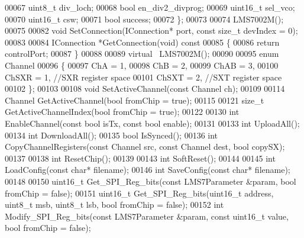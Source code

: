 \begin{DoxyCode}
00067         uint8\_t div_loch;
00068         \textcolor{keywordtype}{bool} en_div2_divprog;
00069         uint16\_t sel_vco;
00070         uint16\_t csw;
00071         \textcolor{keywordtype}{bool} success;
00072     \};
00073 
00074     LMS7002M();
00075 
00082     \textcolor{keywordtype}{void} SetConnection(IConnection* port, \textcolor{keyword}{const} \textcolor{keywordtype}{size\_t} devIndex = 0);
00083 
00084     IConnection *GetConnection(\textcolor{keywordtype}{void})\textcolor{keyword}{ const}
00085 \textcolor{keyword}{    }\{
00086         \textcolor{keywordflow}{return} controlPort;
00087     \}
00088 
00089     \textcolor{keyword}{virtual} ~LMS7002M();
00090 
00095     \textcolor{keyword}{enum} Channel
00096     \{
00097         ChA = 1,
00098         ChB = 2,
00099         ChAB = 3,
00100         ChSXR = 1, \textcolor{comment}{//SXR register space}
00101         ChSXT = 2, \textcolor{comment}{//SXT register space}
00102     \};
00103 
00108     \textcolor{keywordtype}{void} SetActiveChannel(\textcolor{keyword}{const} Channel ch);
00109 
00114     Channel GetActiveChannel(\textcolor{keywordtype}{bool} fromChip = \textcolor{keyword}{true});
00115 
00121     \textcolor{keywordtype}{size\_t} GetActiveChannelIndex(\textcolor{keywordtype}{bool} fromChip = \textcolor{keyword}{true});
00122 
00130     \textcolor{keywordtype}{int} EnableChannel(\textcolor{keyword}{const} \textcolor{keywordtype}{bool} isTx, \textcolor{keyword}{const} \textcolor{keywordtype}{bool} enable);
00131 
00133     \textcolor{keywordtype}{int} UploadAll();
00134     \textcolor{keywordtype}{int} DownloadAll();
00135     \textcolor{keywordtype}{bool} IsSynced();
00136     \textcolor{keywordtype}{int} CopyChannelRegisters(\textcolor{keyword}{const} Channel src, \textcolor{keyword}{const} Channel dest, \textcolor{keywordtype}{bool} copySX);
00137 
00138     \textcolor{keywordtype}{int} ResetChip();
00139 
00143     \textcolor{keywordtype}{int} SoftReset();
00144 
00145     \textcolor{keywordtype}{int} LoadConfig(\textcolor{keyword}{const} \textcolor{keywordtype}{char}* filename);
00146     \textcolor{keywordtype}{int} SaveConfig(\textcolor{keyword}{const} \textcolor{keywordtype}{char}* filename);
00148 
00150     uint16\_t Get_SPI_Reg_bits(\textcolor{keyword}{const} LMS7Parameter &param, \textcolor{keywordtype}{bool} fromChip = \textcolor{keyword}{false});
00151     uint16\_t Get_SPI_Reg_bits(uint16\_t address, uint8\_t msb, uint8\_t lsb, \textcolor{keywordtype}{bool} fromChip = \textcolor{keyword}{false});
00152     \textcolor{keywordtype}{int} Modify_SPI_Reg_bits(\textcolor{keyword}{const} LMS7Parameter &param, \textcolor{keyword}{const} uint16\_t value, \textcolor{keywordtype}{bool} fromChip = \textcolor{keyword}{false});

\end{DoxyCode}
